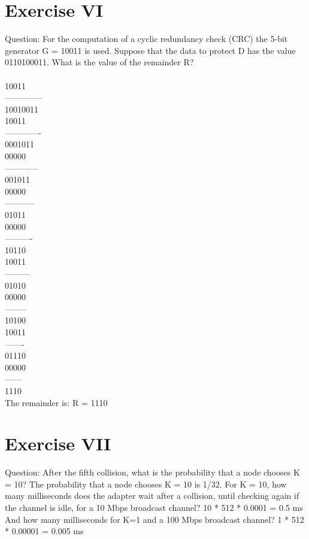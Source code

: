 \documentclass[11pt]{article}
\begin{document}
	\section*{Exercise VI}
	Question:
	For the computation of a cyclic redundancy check (CRC) the 5-bit generator G = 10011 is used. Suppose that the data to protect D has the value 0110100011. What is the value of the remainder R?\\
    \\
	10011\\
	--------------\\
		10010011\\
	  10011\\
	 -------------\\
	  0001011\\
		00000\\
		------------\\
		 001011\\
		 00000\\
		 -----------\\
		  01011\\
			00000\\
			----------\\
			 10110\\
			 10011\\
			 ---------\\
			  01010\\
				00000\\
				--------\\
				 10100\\
				 10011\\
				 -------\\
				  01110\\
					00000\\
					------\\
					 1110\\

	The remainder is: R = 1110
	\section*{Exercise VII}
	Question:
	After the fifth collision, what is the probability that a node chooses K = 10?
	The probability that a node chooses K = 10 is 1/32.
	\linebreak
	For K = 10, how many milliseconds does the adapter wait after a collision, until checking again if the channel is idle, for a 10 Mbps broadcast channel?
	10 * 512 * 0.0001 = 0.5 ms
	\linebreak
	And how many milliseconds for K=1 and a 100 Mbps broadcast channel?
	1 * 512 * 0.00001 = 0.005 ms
\end{document}
